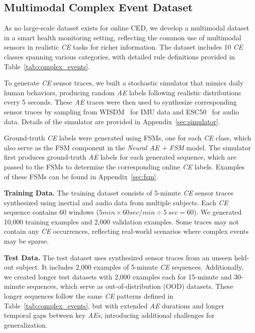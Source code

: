 \subsection{Multimodal Complex Event Dataset}  
As no large-scale dataset exists for online CED, we develop a multimodal dataset in a smart health monitoring setting, reflecting the common use of multimodal sensors in realistic \emph{CE} tasks for richer information. The dataset includes 10 \emph{CE} classes spanning various categories, with detailed rule definitions provided in Table~\ref{tab:complex_events}.




To generate \emph{CE} sensor traces, we built a stochastic simulator that mimics daily human behaviors, producing random \emph{AE} labels following realistic distributions every 5 seconds. These \emph{AE} traces were then used to synthesize corresponding sensor traces by sampling from WISDM~\cite{wisdm} for IMU data and ESC50~\cite{esc50} for audio data. Details of the simulator are provided in Appendix~\ref{sec:simulator}.

Ground-truth \emph{CE} labels were generated using FSMs, one for each \emph{CE} class, which also serve as the FSM component in the \emph{Neural AE + FSM} model. The simulator first produces ground-truth \emph{AE} labels for each generated sequence, which are passed to the FSMs to determine the corresponding online \emph{CE} labels. Examples of these FSMs can be found in Appendix~\ref{sec:fsm}.

\textbf{Training Data.}
The training dataset consists of 5-minute \emph{CE} sensor traces synthesized using inertial and audio data from multiple subjects. Each \emph{CE} sequence contains 60 windows ($5min \times 60sec/min \div 5~sec = 60$). We generated 10,000 training examples and 2,000 validation examples. Some traces may not contain any \emph{CE} occurrences, reflecting real-world scenarios where complex events may be sparse.

\textbf{Test Data.}
The test dataset uses synthesized sensor traces from an unseen held-out subject. It includes 2,000 examples of 5-minute \emph{CE} sequences. Additionally, we created longer test datasets with 2,000 examples each for 15-minute and 30-minute sequences, which serve as out-of-distribution (OOD) datasets. These longer sequences follow the same \emph{CE} patterns defined in Table~\ref{tab:complex_events}, but with extended \emph{AE} durations and longer temporal gaps between key \emph{AEs}, introducing additional challenges for generalization.

